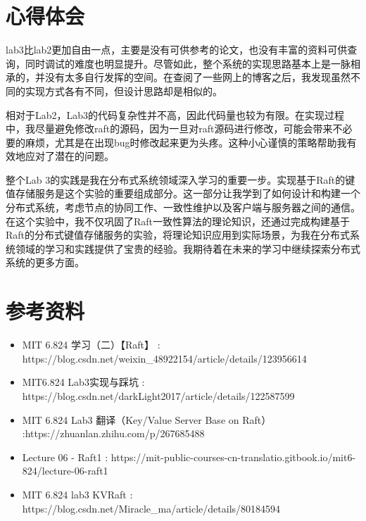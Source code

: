 \documentclass[]{article}
\begin{document}
	\section{心得体会}
	lab3比lab2更加自由一点，主要是没有可供参考的论文，也没有丰富的资料可供查询，同时调试的难度也明显提升。尽管如此，整个系统的实现思路基本上是一脉相承的，并没有太多自行发挥的空间。在查阅了一些网上的博客之后，我发现虽然不同的实现方式各有不同，但设计思路却是相似的。
	
	相对于Lab2，Lab3的代码复杂性并不高，因此代码量也较为有限。在实现过程中，我尽量避免修改raft的源码，因为一旦对raft源码进行修改，可能会带来不必要的麻烦，尤其是在出现bug时修改起来更为头疼。这种小心谨慎的策略帮助我有效地应对了潜在的问题。
	
	整个Lab 3的实践是我在分布式系统领域深入学习的重要一步。实现基于Raft的键值存储服务是这个实验的重要组成部分。这一部分让我学到了如何设计和构建一个分布式系统，考虑节点的协同工作、一致性维护以及客户端与服务器之间的通信。在这个实验中，我不仅巩固了Raft一致性算法的理论知识，还通过完成构建基于Raft的分布式键值存储服务的实验，将理论知识应用到实际场景，为我在分布式系统领域的学习和实践提供了宝贵的经验。我期待着在未来的学习中继续探索分布式系统的更多方面。
	
	\section{参考资料}
	\begin{itemize}
		\item MIT 6.824 学习（二）【Raft】 : https://blog.csdn.net/weixin\_48922154/article/details/123956614
		\item MIT6.824 Lab3实现与踩坑 : https://blog.csdn.net/darkLight2017/article/details/122587599
		\item MIT 6.824 Lab3 翻译（Key/Value Server Base on Raft） :https://zhuanlan.zhihu.com/p/267685488
		\item Lecture 06 - Raft1 : https://mit-public-courses-cn-translatio.gitbook.io/mit6-824/lecture-06-raft1 
		\item MIT 6.824 lab3 KVRaft : https://blog.csdn.net/Miracle\_ma/article/details/80184594
	\end{itemize}
	
\end{document}
